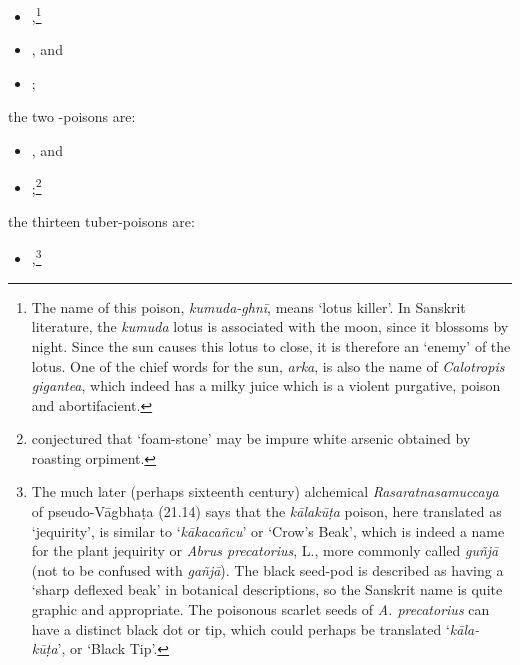 \begin{translation}
\begin{itemize}
        \item {},\footnote{The name of this poison, \emph{kumuda-ghnī}, means 
            `lotus
        killer'.  In Sanskrit literature, the \emph{kumuda} lotus is associated
        with the moon, since it blossoms by night.  Since the sun causes this lotus
        to close, it is therefore an `enemy' of the lotus.  One of the chief words
        for the sun, \emph{arka}, is also the name of \emph{Calotropis gigantea},
        which indeed has a milky juice which is a violent purgative, poison and
        abortifacient.}
        \item {},
        and
        \item {};
            \end{itemize}
        
        \item
        the two -poisons are:
              \begin{itemize}
            
        \item {}, and
        \item {};\footnote{\citet[38--42]{Dutt-1922} conjectured that
        `foam-stone' may be impure white arsenic obtained by roasting orpiment.}
            \end{itemize}
        \item
        the thirteen tuber-poisons are:
        \begin{itemize}
             \item {},\footnote{The much later (perhaps sixteenth century) alchemical
        \emph{Rasa\-ratna\-samuccaya} of pseudo-Vāgbhaṭa (21.14) says that the
        \emph{kāla\-kūṭa} poison, here translated as `jequirity', is similar to
        `\emph{kāka\-cañcu}' or `Crow's Beak', which is indeed a name for the
        plant jequirity or
        \emph{Abrus precatorius}, L., more commonly called \emph{guñjā} (not to
        be confused with \emph{gañjā}). The black seed-pod is described as
        having a `sharp deflexed beak' in botanical descriptions, so the
        Sanskrit name is quite graphic and appropriate. The poisonous scarlet
        seeds of \emph{A. precatorius} can have a distinct black dot or tip,
        which could perhaps be translated `\emph{kāla-kūṭa}', or `Black Tip'.
        
}
\end{itemize}
\end{translation}
